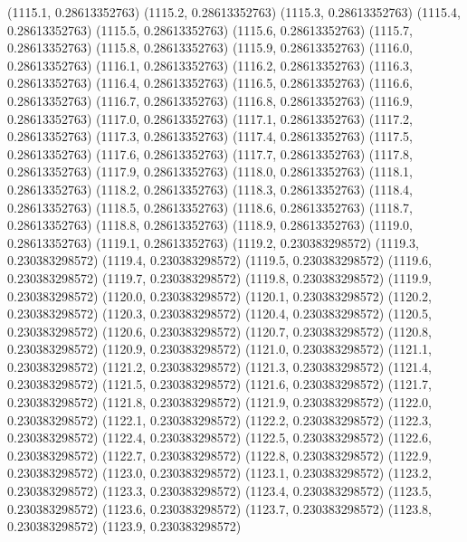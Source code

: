 {					(1115.1, 0.28613352763)
					(1115.2, 0.28613352763)
					(1115.3, 0.28613352763)
					(1115.4, 0.28613352763)
					(1115.5, 0.28613352763)
					(1115.6, 0.28613352763)
					(1115.7, 0.28613352763)
					(1115.8, 0.28613352763)
					(1115.9, 0.28613352763)
					(1116.0, 0.28613352763)
					(1116.1, 0.28613352763)
					(1116.2, 0.28613352763)
					(1116.3, 0.28613352763)
					(1116.4, 0.28613352763)
					(1116.5, 0.28613352763)
					(1116.6, 0.28613352763)
					(1116.7, 0.28613352763)
					(1116.8, 0.28613352763)
					(1116.9, 0.28613352763)
					(1117.0, 0.28613352763)
					(1117.1, 0.28613352763)
					(1117.2, 0.28613352763)
					(1117.3, 0.28613352763)
					(1117.4, 0.28613352763)
					(1117.5, 0.28613352763)
					(1117.6, 0.28613352763)
					(1117.7, 0.28613352763)
					(1117.8, 0.28613352763)
					(1117.9, 0.28613352763)
					(1118.0, 0.28613352763)
					(1118.1, 0.28613352763)
					(1118.2, 0.28613352763)
					(1118.3, 0.28613352763)
					(1118.4, 0.28613352763)
					(1118.5, 0.28613352763)
					(1118.6, 0.28613352763)
					(1118.7, 0.28613352763)
					(1118.8, 0.28613352763)
					(1118.9, 0.28613352763)
					(1119.0, 0.28613352763)
					(1119.1, 0.28613352763)
					(1119.2, 0.230383298572)
					(1119.3, 0.230383298572)
					(1119.4, 0.230383298572)
					(1119.5, 0.230383298572)
					(1119.6, 0.230383298572)
					(1119.7, 0.230383298572)
					(1119.8, 0.230383298572)
					(1119.9, 0.230383298572)
					(1120.0, 0.230383298572)
					(1120.1, 0.230383298572)
					(1120.2, 0.230383298572)
					(1120.3, 0.230383298572)
					(1120.4, 0.230383298572)
					(1120.5, 0.230383298572)
					(1120.6, 0.230383298572)
					(1120.7, 0.230383298572)
					(1120.8, 0.230383298572)
					(1120.9, 0.230383298572)
					(1121.0, 0.230383298572)
					(1121.1, 0.230383298572)
					(1121.2, 0.230383298572)
					(1121.3, 0.230383298572)
					(1121.4, 0.230383298572)
					(1121.5, 0.230383298572)
					(1121.6, 0.230383298572)
					(1121.7, 0.230383298572)
					(1121.8, 0.230383298572)
					(1121.9, 0.230383298572)
					(1122.0, 0.230383298572)
					(1122.1, 0.230383298572)
					(1122.2, 0.230383298572)
					(1122.3, 0.230383298572)
					(1122.4, 0.230383298572)
					(1122.5, 0.230383298572)
					(1122.6, 0.230383298572)
					(1122.7, 0.230383298572)
					(1122.8, 0.230383298572)
					(1122.9, 0.230383298572)
					(1123.0, 0.230383298572)
					(1123.1, 0.230383298572)
					(1123.2, 0.230383298572)
					(1123.3, 0.230383298572)
					(1123.4, 0.230383298572)
					(1123.5, 0.230383298572)
					(1123.6, 0.230383298572)
					(1123.7, 0.230383298572)
					(1123.8, 0.230383298572)
					(1123.9, 0.230383298572)
}
